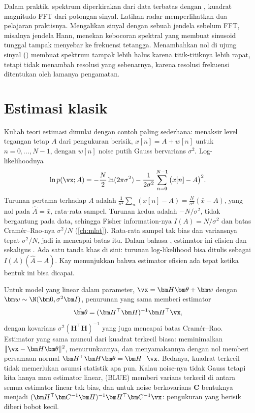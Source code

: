 Dalam praktik, spektrum diperkirakan dari data terbatas dengan , kuadrat magnitudo
FFT dari potongan sinyal. Latihan radar memperlihatkan dua pelajaran praktisnya. Mengalikan sinyal
dengan sebuah jendela sebelum FFT, misalnya jendela Hann, menekan kebocoran spektral yang membuat sinusoid
tunggal tampak menyebar ke frekuensi tetangga. Menambahkan nol di ujung sinyal ()
membuat spektrum tampak lebih halus karena titik-titiknya lebih rapat, tetapi tidak menambah resolusi
yang sebenarnya, karena resolusi frekuensi ditentukan oleh lamanya pengamatan.

\section{Estimasi klasik}

Kuliah teori estimasi dimulai dengan contoh paling sederhana: menaksir level tegangan tetap $A$ dari
pengukuran berisik, $x[n]=A+w[n]$ untuk $n=0,\dots,N-1$, dengan $w[n]$ noise putih Gauss bervarians
$\sigma^2$. Log-likelihoodnya
\begin{equation}
\ln p(\vx;A)=-\frac N2\ln(2\pi\sigma^2)-\frac1{2\sigma^2}\sum_{n=0}^{N-1}\big(x[n]-A\big)^2.
\end{equation}
Turunan pertama terhadap $A$ adalah $\frac1{\sigma^2}\sum_n(x[n]-A)=\frac N{\sigma^2}(\bar x-A)$, yang nol
pada $\hat A=\bar x$, rata-rata sampel. Turunan kedua adalah $-N/\sigma^2$, tidak bergantung pada data,
sehingga Fisher information-nya $I(A)=N/\sigma^2$ dan batas Cramér--Rao-nya $\sigma^2/N$ (\cref{ch:mlat}).
Rata-rata sampel tak bias dan variansnya tepat $\sigma^2/N$, jadi ia mencapai batas itu. Dalam bahasa
\citet{kay1993}, estimator ini efisien dan sekaligus . Ada satu
tanda khas di sini: turunan log-likelihood bisa ditulis sebagai $I(A)(\hat A-A)$. Kay menunjukkan bahwa
estimator efisien ada tepat ketika bentuk ini bisa dicapai.

Untuk model yang linear dalam parameter, $\vx=\bm H\bm\theta+\bm w$ dengan $\bm w\sim\N(\bm0,\sigma^2\bm I)$,
penurunan yang sama memberi estimator
\begin{equation}
\hat{\bm\theta}=(\bm H^\top\bm H)^{-1}\bm H^\top\vx,
\end{equation}
dengan kovarians $\sigma^2(\bm H^\top\bm H)^{-1}$ yang juga mencapai batas Cramér--Rao. Estimator yang sama
muncul dari kuadrat terkecil biasa: meminimalkan $\|\vx-\bm H\bm\theta\|^2$, menurunkannya, dan menyamakannya
dengan nol memberi persamaan normal $\bm H^\top\bm H\bm\theta=\bm H^\top\vx$. Bedanya, kuadrat terkecil tidak
memerlukan asumsi statistik apa pun. Kalau noise-nya tidak Gauss tetapi kita hanya mau estimator linear,
 (BLUE) memberi varians terkecil di antara semua estimator linear
tak bias, dan untuk noise berkovarians $\bm C$ bentuknya menjadi $(\bm H^\top\bm C^{-1}\bm H)^{-1}\bm H^\top\bm C^{-1}\vx$:
pengukuran yang berisik diberi bobot kecil.

